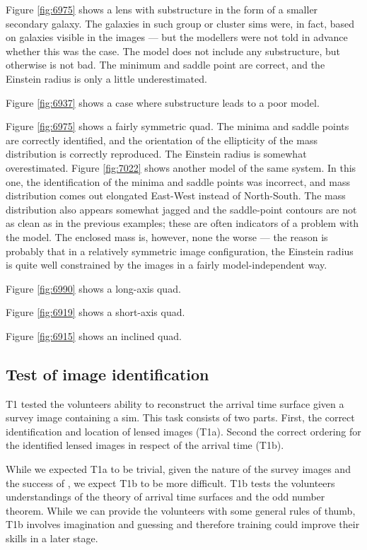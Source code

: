 Figure \ref{fig:6975} shows a lens with substructure in the form of a
smaller secondary galaxy.  The galaxies in such group or cluster sims
were, in fact, based on galaxies visible in the images --- but the
modellers were not told in advance whether this was the case.  The
model does not include any substructure, but otherwise is not bad.
The minimum and saddle point are correct, and the Einstein radius is
only a little underestimated.

Figure \ref{fig:6937} shows a case where substructure leads to a
poor model.

Figure \ref{fig:6975} shows a fairly symmetric quad.  The minima and
saddle points are correctly identified, and the orientation of the
ellipticity of the mass distribution is correctly reproduced.  The
Einstein radius is somewhat overestimated.  Figure \ref{fig:7022}
shows another model of the same system.  In this one, the
identification of the minima and saddle points was incorrect, and mass
distribution comes out elongated East-West instead of North-South.
The mass distribution also appears somewhat jagged and the
saddle-point contours are not as clean as in the previous examples;
these are often indicators of a problem with the model.  The enclosed
mass is, however, none the worse --- the reason is probably that in a
relatively symmetric image configuration, the Einstein radius is quite
well constrained by the images in a fairly model-independent way.

Figure \ref{fig:6990} shows a long-axis quad.

Figure \ref{fig:6919} shows a short-axis quad.

Figure \ref{fig:6915} shows an inclined quad.

\subsection{Test of image identification} \label{sec:tests.t1}

T1 tested the volunteers ability to reconstruct the arrival time surface given a survey image containing a sim.
This task consists of two parts.
First, the correct identification and location of lensed images (T1a).
Second the correct ordering for the identified lensed images in respect of the arrival time (T1b).

While we expected T1a to be trivial, given the nature of the survey images and the success of \sw, we expect T1b to be more difficult.
T1b tests the volunteers understandings of the theory of arrival time surfaces and the odd number theorem.
While we can provide the volunteers with some general rules of thumb, T1b involves imagination and guessing and therefore training could improve their skills in a later stage.

